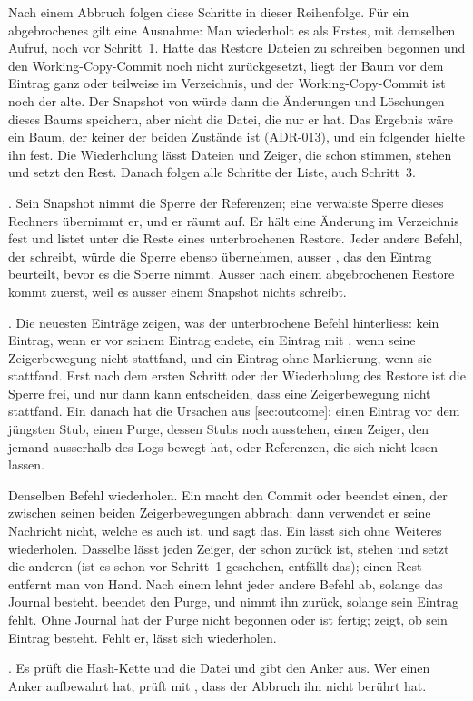 {Nach einem Abbruch folgen diese Schritte in dieser Reihenfolge.
Für ein abgebrochenes  gilt eine Ausnahme:
Man wiederholt es als Erstes, mit demselben Aufruf, noch vor Schritt~1.
Hatte das Restore Dateien zu schreiben begonnen
und den Working-Copy-Commit noch nicht zurückgesetzt,
liegt der Baum vor dem Eintrag ganz oder teilweise im Verzeichnis,
und der Working-Copy-Commit ist noch der alte.
Der Snapshot von  würde dann die Änderungen und Löschungen dieses Baums speichern,
aber nicht die Datei, die nur er hat.
Das Ergebnis wäre ein Baum, der keiner der beiden Zustände ist (ADR-013),
und ein folgender  hielte ihn fest.
Die Wiederholung lässt Dateien und Zeiger, die schon stimmen, stehen und setzt den Rest.
Danach folgen alle Schritte der Liste, auch Schritt~3.

\startitemize[n]
\item {}.
Sein Snapshot nimmt die Sperre der Referenzen;
eine verwaiste Sperre dieses Rechners übernimmt er, und er räumt  auf.
Er hält eine Änderung im Verzeichnis fest
und listet unter \type{!} die Reste eines unterbrochenen Restore.
Jeder andere Befehl, der schreibt, würde die Sperre ebenso übernehmen,
ausser , das den Eintrag beurteilt, bevor es die Sperre nimmt.
Ausser nach einem abgebrochenen Restore kommt  zuerst,
weil es ausser einem Snapshot nichts schreibt.
\item {}.
Die neuesten Einträge zeigen, was der unterbrochene Befehl hinterliess:
kein Eintrag, wenn er vor seinem Eintrag endete,
ein Eintrag mit \type{!}, wenn seine Zeigerbewegung nicht stattfand,
und ein Eintrag ohne Markierung, wenn sie stattfand.
Erst nach dem ersten Schritt oder der Wiederholung des Restore ist die Sperre frei,
und nur dann kann  entscheiden, dass eine Zeigerbewegung nicht stattfand.
Ein  danach hat die Ursachen aus [sec:outcome]:
einen Eintrag vor dem jüngsten Stub, einen Purge, dessen Stubs noch ausstehen,
einen Zeiger, den jemand ausserhalb des Logs bewegt hat, oder Referenzen,
die sich nicht lesen lassen.
\item Denselben Befehl wiederholen.
Ein  macht den Commit
oder beendet einen, der zwischen seinen beiden Zeigerbewegungen abbrach;
dann verwendet er seine Nachricht nicht, welche es auch ist, und sagt das.
Ein  lässt sich ohne Weiteres wiederholen.
Dasselbe  lässt jeden Zeiger, der schon zurück ist, stehen
und setzt die anderen (ist es schon vor Schritt~1 geschehen, entfällt das);
einen Rest  entfernt man von Hand.
Nach einem  lehnt jeder andere Befehl ab, solange das Journal besteht.
 beendet den Purge,
und  nimmt ihn zurück, solange sein Eintrag fehlt.
Ohne Journal hat der Purge nicht begonnen oder ist fertig;
 zeigt, ob sein Eintrag besteht.
Fehlt er, lässt sich  wiederholen.
\item {}.
Es prüft die Hash-Kette und die Datei  und gibt den Anker aus.
Wer einen Anker aufbewahrt hat, prüft mit , dass der Abbruch ihn nicht berührt hat.
\stopitemize

}
